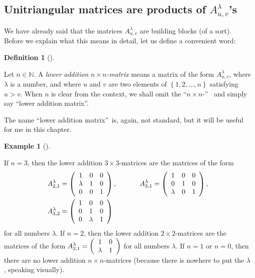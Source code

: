 \documentclass[numbers=enddot,12pt,final,onecolumn,notitlepage]{scrartcl}%
\theoremstyle{definition}
\newtheorem{defi}[theo]{Definition}
\newenvironment{definition}[1][]
{\begin{defi}[#1]\begin{leftbar}}
{\end{leftbar}\end{defi}}
\newtheorem{exam}[theo]{Example}
\newenvironment{example}[1][]
{\begin{exam}[#1]\begin{leftbar}}
{\end{leftbar}\end{exam}}
\begin{document}
\subsection{Unitriangular matrices are products of $A_{u,v}^{\lambda}$'s}

We have already said that the matrices $A_{u,v}^{\lambda}$ are building blocks
(of a sort). Before we explain what this means in detail, let us define a
convenient word:

\begin{definition}
\label{def.Alamuv.laddition}Let $n\in\mathbb{N}$. A \textit{lower addition
}$n\times n$\textit{-matrix} means a matrix of the form $A_{u,v}^{\lambda}$,
where $\lambda$ is a number, and where $u$ and $v$ are two elements of
$\left\{  1,2,\ldots,n\right\}  $ satisfying $u>v$. When $n$ is clear from the
context, we shall omit the \textquotedblleft$n\times n$-\textquotedblright%
\ and simply say \textquotedblleft lower addition matrix\textquotedblright.
\end{definition}

The name \textquotedblleft lower addition matrix\textquotedblright\ is, again,
not standard, but it will be useful for me in this chapter.

\begin{example}
If $n=3$, then the lower addition $3\times3$-matrices are the matrices of the
form%
\begin{align*}
A_{2,1}^{\lambda}  &  =\left(
\begin{array}
[c]{ccc}%
1 & 0 & 0\\
\lambda & 1 & 0\\
0 & 0 & 1
\end{array}
\right)  ,\ \ \ \ \ \ \ \ \ \ A_{3,1}^{\lambda}=\left(
\begin{array}
[c]{ccc}%
1 & 0 & 0\\
0 & 1 & 0\\
\lambda & 0 & 1
\end{array}
\right)  ,\\
A_{3,2}^{\lambda}  &  =\left(
\begin{array}
[c]{ccc}%
1 & 0 & 0\\
0 & 1 & 0\\
0 & \lambda & 1
\end{array}
\right)
\end{align*}
for all numbers $\lambda$. If $n=2$, then the lower addition $2\times
2$-matrices are the matrices of the form $A_{2,1}^{\lambda}=\left(
\begin{array}
[c]{cc}%
1 & 0\\
\lambda & 1
\end{array}
\right)  $ for all numbers $\lambda$. If $n=1$ or $n=0$, then there are no
lower addition $n\times n$-matrices (because there is nowhere to put the
$\lambda$, speaking visually).
\end{example}
\end{document}
